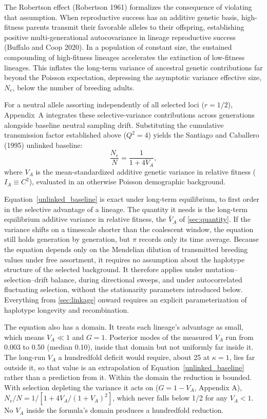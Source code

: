 \documentclass[12pt]{article}
\begin{document}
The Robertson effect (Robertson 1961) formalizes the consequence of violating that assumption. When reproductive success has an additive genetic basis, high-fitness parents transmit their favorable alleles to their offspring, establishing positive multi-generational autocovariance in lineage reproductive success (Buffalo and Coop 2020). In a population of constant size, the sustained compounding of high-fitness lineages accelerates the extinction of low-fitness lineages. This inflates the long-term variance of ancestral genetic contributions far beyond the Poisson expectation, depressing the asymptotic variance effective size, $N_e$, below the number of breeding adults.

For a neutral allele assorting independently of all selected loci ($r = 1/2$), Appendix~A integrates these selective-variance contributions across generations alongside baseline neutral sampling drift. Substituting the cumulative transmission factor established above ($Q^2 = 4$) yields the Santiago and Caballero (1995) unlinked baseline:
\begin{equation}
\frac{N_e}{N} = \frac{1}{1 + 4V_A}, \label{unlinked_baseline}
\end{equation}
where $V_A$ is the mean-standardized additive genetic variance in relative fitness ($I_A \equiv C^2$), evaluated in an otherwise Poisson demographic background.

Equation~\eqref{unlinked_baseline} is exact under long-term equilibrium, to first order in the selective advantage of a lineage. The quantity it needs is the long-term equilibrium additive variance in relative fitness, the $\bar{V}_A$ of \autoref{sec:quantity}. If the variance shifts on a timescale shorter than the coalescent window, the equation still holds generation by generation, but $\pi$ records only its time average. Because the equation depends only on the Mendelian dilution of transmitted breeding values under free assortment, it requires no assumption about the haplotype structure of the selected background. It therefore applies under mutation--selection--drift balance, during directional sweeps, and under autocorrelated fluctuating selection, without the stationarity parameters introduced below. Everything from \autoref{sec:linkage} onward requires an explicit parameterization of haplotype longevity and recombination.

The equation also has a domain. It treats each lineage's advantage as small, which means $V_A \ll 1$ and $G = 1$. Posterior modes of the measured $V_A$ run from 0.003 to 0.50 (median 0.10), inside that domain but not uniformly far inside it. The long-run $V_A$ a hundredfold deficit would require, about 25 at $\kappa = 1$, lies far outside it, so that value is an extrapolation of Equation~\eqref{unlinked_baseline} rather than a prediction from it. Within the domain the reduction is bounded. With selection depleting the variance it acts on ($G = 1 - V_A$, Appendix A), $N_e/N = 1/[1 + 4V_A/(1+V_A)^2]$, which never falls below 1/2 for any $V_A < 1$. No $V_A$ inside the formula's domain produces a hundredfold reduction.
\end{document}
